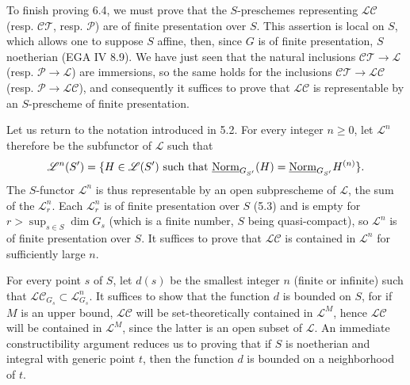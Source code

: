 To finish proving 6.4, we must prove that the $S$-preschemes representing $\mathscr{LC}$ (resp. $\mathscr{CT}$, resp. $\mathscr P$) are of finite presentation over $S$. This assertion is local on $S$, which allows one to suppose $S$ affine, then, since $G$ is of finite presentation, $S$ noetherian (EGA IV 8.9). We have just seen that the natural inclusions $\mathscr{CT}\to\mathscr L$ (resp. $\mathscr P\to\mathscr L$) are immersions, so the same holds for the inclusions $\mathscr{CT}\to\mathscr{LC}$ (resp. $\mathscr P\to\mathscr{LC}$), and consequently it suffices to prove that $\mathscr{LC}$ is representable by an $S$-prescheme of finite presentation.

Let us return to the notation introduced in 5.2. For every integer $n\geq0$, let $\mathscr L^n$ therefore be the subfunctor of $\mathscr L$ such that
\[
\mathscr L^n(S')=\{H\in\mathscr L(S')\text{ such that }\underline{\mathrm{Norm}}_{G_{S'}}(H)=\underline{\mathrm{Norm}}_{G_{S'}}H^{(n)}\}.
\]
The $S$-functor $\mathscr L^n$ is thus representable by an open subprescheme of $\mathscr L$, the sum of the $\mathscr L_r^n$. Each $\mathscr L_r^n$ is of finite presentation over $S$ (5.3) and is empty for $r>\sup_{s\in S}\dim G_s$ (which is a finite number, $S$ being quasi-compact), so $\mathscr L^n$ is of finite presentation over $S$. It suffices to prove that $\mathscr{LC}$ is contained in $\mathscr L^n$ for sufficiently large $n$.

For every point $s$ of $S$, let $d(s)$ be the smallest integer $n$ (finite or infinite) such that $\mathscr{LC}_{G_s}\subset\mathscr L^n_{G_s}$. It suffices to show that the function $d$ is bounded on $S$, for if $M$ is an upper bound, $\mathscr{LC}$ will be set-theoretically contained in $\mathscr L^M$, hence $\mathscr{LC}$ will be contained in $\mathscr L^M$, since the latter is an open subset of $\mathscr L$. An immediate constructibility argument reduces us to proving that if $S$ is noetherian and integral with generic point $t$, then the function $d$ is bounded on a neighborhood of $t$.

